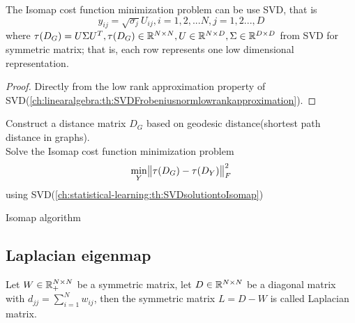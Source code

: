 \begin{refsection}
\begin{lemma}\label{ch:statistical-learning:th:SVDsolutiontoIsomap}
The Isomap cost function minimization problem can be use SVD, that is
$$y_{ij} = \sqrt{\sigma_j}U_{ij},i=1,2,...N,j=1,2...,D$$
where $\tau(D_G) = U\Sigma U^T, \tau(D_G)\in \mathbb{R}^{N\times N}, U\in \mathbb{R}^{N\times D}, \Sigma \in \mathbb{R}^{D\times D}$ from SVD for symmetric matrix; that is, each row represents one low dimensional representation.
\end{lemma}
\begin{proof}
Directly from the low rank approximation property of SVD(\autoref{ch:linearalgebra:th:SVDFrobeniusnormlowrankapproximation}).
\end{proof}


\begin{algorithm}[H]
	\SetAlgoLined
	Construct a distance matrix $D_G$ based on geodesic distance(shortest path distance in graphs).\\
	
	Solve the Isomap cost function minimization problem
	$$\min_{Y} \norm{\tau(D_G) - \tau(D_Y)}^2_F$$ using SVD(\autoref{ch:statistical-learning:th:SVDsolutiontoIsomap})\\

	
	\caption{Isomap algorithm}
\end{algorithm}


\subsection{Laplacian eigenmap}




\begin{definition}
Let $W\in \mathbb{R}^{N\times N}_+$ be a symmetric matrix, let $D\in \mathbb{R}^{N\times N}$ be a diagonal matrix with $d_{jj}=\sum_{i=1}^N w_{ij}$, then the symmetric matrix $L=D-W$ is called Laplacian matrix.
\end{definition}


\end{refsection}
